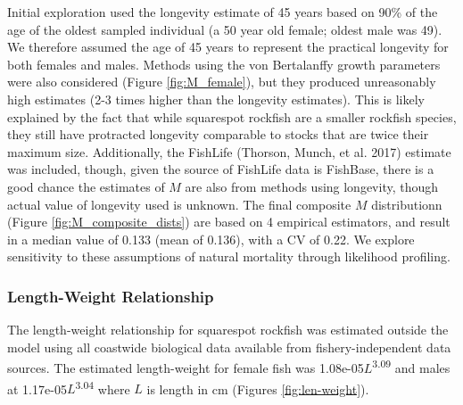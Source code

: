 \documentclass[11pt,
  english,
  a4paper,
]{article}
\begin{document}
Initial exploration used the longevity estimate of 45 years based on 90\% of the age of the oldest sampled individual (a 50 year old female; oldest male was 49). We therefore assumed the age of 45 years to represent the practical longevity for both females and males. Methods using the von Bertalanffy growth parameters were also considered (Figure \ref{fig:M_female}), but they produced unreasonably high estimates (2-3 times higher than the longevity estimates). This is likely explained by the fact that while squarespot rockfish are a smaller rockfish species, they still have protracted longevity comparable to stocks that are twice their maximum size. Additionally, the FishLife {(Thorson, Munch, et al. 2017)\leavevmode\tagmcend\tagstructend} estimate was included, though, given the source of FishLife data is FishBase, there is a good chance the estimates of {\(M\)\leavevmode\tagmcend\tagstructend} are also from methods using longevity, though actual value of longevity used is unknown. The final composite {\(M\)\leavevmode\tagmcend\tagstructend} distributionn (Figure \ref{fig:M_composite_dists}) are based on 4 empirical estimators, and result in a median value of 0.133 (mean of 0.136), with a CV of 0.22. We explore sensitivity to these assumptions of natural mortality through likelihood profiling.

\leavevmode\tagmcend\tagstructend\par


\hypertarget{length-weight-relationship}{%
\subsubsection{Length-Weight Relationship}\label{length-weight-relationship}}

\leavevmode\tagmcend\tagstructend


The length-weight relationship for squarespot rockfish was estimated outside the model using all coastwide biological data available from fishery-independent data sources. The estimated length-weight for female fish was 1.08e-05{\(L\)\leavevmode\tagmcend\tagstructend}\textsuperscript{3.09} and males at 1.17e-05{\(L\)\leavevmode\tagmcend\tagstructend}\textsuperscript{3.04} where {\(L\)\leavevmode\tagmcend\tagstructend} is length in cm (Figures \ref{fig:len-weight}).
\end{document}

